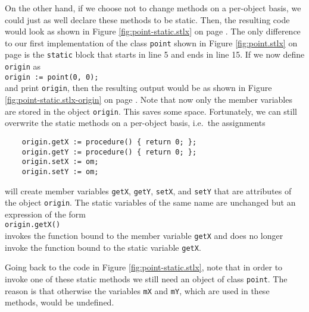 On the other hand, if we choose not to change methods on a per-object basis, we could just as well
declare these methods to be static.  Then, the resulting code would look as shown in Figure
\ref{fig:point-static.stlx} on page \pageref{fig:point-static.stlx}.  The only difference to our
first implementation of the class \texttt{point} shown in Figure \ref{fig:point.stlx} on page
\pageref{fig:point.stlx} is the \texttt{static} block that starts in line 5 and ends in line 15.
If we now define \texttt{origin} as
\\[0.2cm]
\hspace*{1.3cm}
\texttt{origin := point(0, 0);}
\\[0.2cm]
and print \texttt{origin}, then the resulting output would be as shown in Figure
\ref{fig:point-static.stlx-origin} on page \pageref{fig:point-static.stlx-origin}.
Note that now only the member variables are stored in the object
\texttt{origin}.  This saves some space.  
Fortunately, we can still overwrite the static methods on a per-object
basis, i.e.~the assignments
\begin{verbatim}
    origin.getX := procedure() { return 0; };
    origin.getY := procedure() { return 0; };
    origin.setX := om;
    origin.setY := om;
\end{verbatim}
will create member variables \texttt{getX}, \texttt{getY}, \texttt{setX}, and \texttt{setY}
that are attributes of the object \texttt{origin}.  The static variables of the same name are
unchanged but an expression of the form
\\[0.2cm]
\hspace*{1.3cm}
\texttt{origin.getX()}
\\[0.2cm]
invokes the function bound to the member variable \texttt{getX} and does no longer invoke
the function bound to the static variable \texttt{getX}.

Going back to the code in Figure \ref{fig:point-static.stlx}, note that in order to invoke one of these
static methods we still need an object of class \texttt{point}.  The reason is that otherwise the
variables \texttt{mX} and \texttt{mY}, which are used in these methods, would be undefined.

